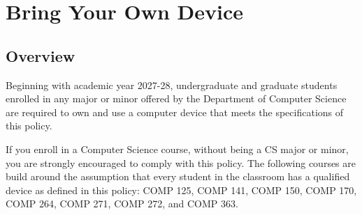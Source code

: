\newpage\section*{Bring Your Own Device}

\subsection*{Overview}
Beginning with academic year 2027-28, undergraduate and graduate students enrolled in any major or minor offered by the Department of Computer Science are required to own and use a computer device that meets the specifications of this policy.

If you enroll in a Computer Science course, without being a CS major or minor, you are strongly encouraged to comply with this policy. The following courses are build around the assumption that every student in the classroom has a qualified device as defined in this policy: COMP 125, COMP 141, COMP 150, COMP 170, COMP 264, COMP 271, COMP 272, and COMP 363.